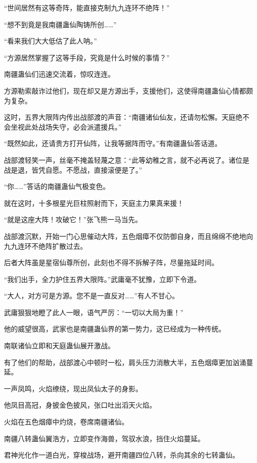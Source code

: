 
\begin{this_body}

“世间居然有这等奇阵，能直接克制九九连环不绝阵！”

“想不到竟是我南疆蛊仙陶铸所创……”

“看来我们大大低估了此人呐。”

“方源居然掌握了这等手段，究竟是什么时候的事情？”

南疆蛊仙们迅速交流着，惊叹连连。

方源勒索敲诈过他们，现在却又是方源出手，支援他们，这使得南疆蛊仙心情都颇为复杂。

这时，五界大限阵内传出战部渡的声音：“南疆诸仙仙友，还请勿松懈。天庭绝不会坐视此处战场失守，必会派遣援兵。”

“既然如此，还请贵方打开仙阵，让我等据阵而守。”有南疆蛊仙答话道。

战部渡轻笑一声，丝毫不掩盖轻蔑之意：“此等幼稚之言，就不必再说了。诸位是战是退，皆凭自愿。不愿战，直接滚便是了。”

“你……”答话的南疆蛊仙气极变色。

就在这时，十多根星光巨柱照射而下，天庭主力果真来援！

“就是这座大阵！攻破它！”张飞熊一马当先。

战部渡沉默，开始一门心思催动大阵，五色烟瘴不仅防御自身，而且绵绵不绝地向九九连环不绝阵扩散过去。

后者大阵虽是星宿仙尊所创，此刻也不得不拆解子阵，尽量拖延时间。

“我们出手，全力护住五界大限阵。”武庸毫不犹豫，立即下令道。

“大人，对方可是方源。您不是一直反对……”有人不甘心。

武庸狠狠地瞪了此人一眼，语气严厉：“一切以大局为重！”

他的威望很高，武家也是南疆蛊仙界的第一势力，这已经成为一种传统。

南联诸仙立即和天庭蛊仙展开激战。

有了他们的帮助，战部渡心中顿时一松，肩头压力消散大半，五色烟瘴更加汹涌蔓延。

一声凤鸣，火焰缭绕，现出凤仙太子的身影。

他凤目高冠，身披金色披风，张口吐出滔天火焰。

火焰在五色烟瘴中灼烧，卷席南疆诸仙。

南疆八转蛊仙翼浩方，立即变作海兽，驾驭水浪，挡住火焰蔓延。

君神光化作一道白光，穿梭战场，避开南疆四位八转，杀向其余的七转蛊仙。


\end{this_body}
